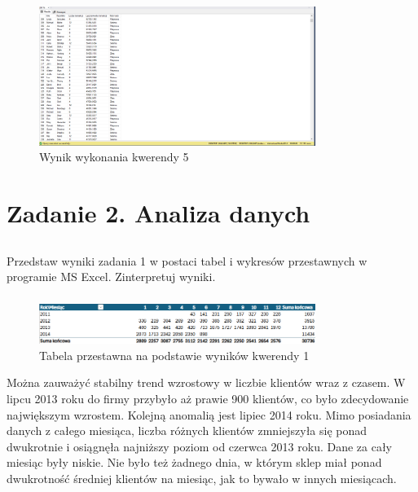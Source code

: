 \documentclass[a4paper,12pt]{article}
\begin{document}
\begin{figure}[H]
    \centering
    \includegraphics[width=0.8\textwidth]{images/05.png}
    \caption{Wynik wykonania kwerendy 5}
\end{figure}

\section{Zadanie 2. Analiza danych}

\subsection{}

Przedstaw wyniki zadania 1 w postaci tabel i wykresów przestawnych w programie MS Excel. Zinterpretuj wyniki.

\subsubsection{}

\begin{figure}[H]
    \centering
    \includegraphics[width=0.8\textwidth]{images/excel/01.png}
    \caption{Tabela przestawna na podstawie wyników kwerendy 1}
\end{figure}

Można zauważyć stabilny trend wzrostowy w liczbie klientów wraz z czasem. W lipcu 2013 roku do firmy przybyło aż prawie 900 klientów, co było zdecydowanie największym wzrostem. Kolejną anomalią jest lipiec 2014 roku. Mimo posiadania danych z całego miesiąca, liczba różnych klientów zmniejszyła się ponad dwukrotnie i osiągnęła najniższy poziom od czerwca 2013 roku. Dane za cały miesiąc były niskie. Nie było też żadnego dnia, w którym sklep miał ponad dwukrotność średniej klientów na miesiąc, jak to bywało w innych miesiącach.
\end{document}
